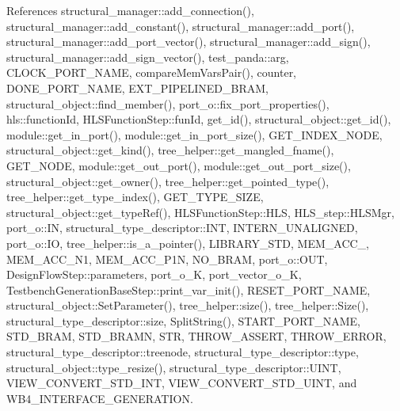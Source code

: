 References structural\+\_\+manager\+::add\+\_\+connection(), structural\+\_\+manager\+::add\+\_\+constant(), structural\+\_\+manager\+::add\+\_\+port(), structural\+\_\+manager\+::add\+\_\+port\+\_\+vector(), structural\+\_\+manager\+::add\+\_\+sign(), structural\+\_\+manager\+::add\+\_\+sign\+\_\+vector(), test\+\_\+panda\+::arg, C\+L\+O\+C\+K\+\_\+\+P\+O\+R\+T\+\_\+\+N\+A\+ME, compare\+Mem\+Vars\+Pair(), counter, D\+O\+N\+E\+\_\+\+P\+O\+R\+T\+\_\+\+N\+A\+ME, E\+X\+T\+\_\+\+P\+I\+P\+E\+L\+I\+N\+E\+D\+\_\+\+B\+R\+AM, structural\+\_\+object\+::find\+\_\+member(), port\+\_\+o\+::fix\+\_\+port\+\_\+properties(), hls\+::function\+Id, H\+L\+S\+Function\+Step\+::fun\+Id, get\+\_\+id(), structural\+\_\+object\+::get\+\_\+id(), module\+::get\+\_\+in\+\_\+port(), module\+::get\+\_\+in\+\_\+port\+\_\+size(), G\+E\+T\+\_\+\+I\+N\+D\+E\+X\+\_\+\+N\+O\+DE, structural\+\_\+object\+::get\+\_\+kind(), tree\+\_\+helper\+::get\+\_\+mangled\+\_\+fname(), G\+E\+T\+\_\+\+N\+O\+DE, module\+::get\+\_\+out\+\_\+port(), module\+::get\+\_\+out\+\_\+port\+\_\+size(), structural\+\_\+object\+::get\+\_\+owner(), tree\+\_\+helper\+::get\+\_\+pointed\+\_\+type(), tree\+\_\+helper\+::get\+\_\+type\+\_\+index(), G\+E\+T\+\_\+\+T\+Y\+P\+E\+\_\+\+S\+I\+ZE, structural\+\_\+object\+::get\+\_\+type\+Ref(), H\+L\+S\+Function\+Step\+::\+H\+LS, H\+L\+S\+\_\+step\+::\+H\+L\+S\+Mgr, port\+\_\+o\+::\+IN, structural\+\_\+type\+\_\+descriptor\+::\+I\+NT, I\+N\+T\+E\+R\+N\+\_\+\+U\+N\+A\+L\+I\+G\+N\+ED, port\+\_\+o\+::\+IO, tree\+\_\+helper\+::is\+\_\+a\+\_\+pointer(), L\+I\+B\+R\+A\+R\+Y\+\_\+\+S\+TD, M\+E\+M\+\_\+\+A\+C\+C\+\_, M\+E\+M\+\_\+\+A\+C\+C\+\_\+\+N1, M\+E\+M\+\_\+\+A\+C\+C\+\_\+\+P1N, N\+O\+\_\+\+B\+R\+AM, port\+\_\+o\+::\+O\+UT, Design\+Flow\+Step\+::parameters, port\+\_\+o\+\_\+K, port\+\_\+vector\+\_\+o\+\_\+K, Testbench\+Generation\+Base\+Step\+::print\+\_\+var\+\_\+init(), R\+E\+S\+E\+T\+\_\+\+P\+O\+R\+T\+\_\+\+N\+A\+ME, structural\+\_\+object\+::\+Set\+Parameter(), tree\+\_\+helper\+::size(), tree\+\_\+helper\+::\+Size(), structural\+\_\+type\+\_\+descriptor\+::size, Split\+String(), S\+T\+A\+R\+T\+\_\+\+P\+O\+R\+T\+\_\+\+N\+A\+ME, S\+T\+D\+\_\+\+B\+R\+AM, S\+T\+D\+\_\+\+B\+R\+A\+MN, S\+TR, T\+H\+R\+O\+W\+\_\+\+A\+S\+S\+E\+RT, T\+H\+R\+O\+W\+\_\+\+E\+R\+R\+OR, structural\+\_\+type\+\_\+descriptor\+::treenode, structural\+\_\+type\+\_\+descriptor\+::type, structural\+\_\+object\+::type\+\_\+resize(), structural\+\_\+type\+\_\+descriptor\+::\+U\+I\+NT, V\+I\+E\+W\+\_\+\+C\+O\+N\+V\+E\+R\+T\+\_\+\+S\+T\+D\+\_\+\+I\+NT, V\+I\+E\+W\+\_\+\+C\+O\+N\+V\+E\+R\+T\+\_\+\+S\+T\+D\+\_\+\+U\+I\+NT, and W\+B4\+\_\+\+I\+N\+T\+E\+R\+F\+A\+C\+E\+\_\+\+G\+E\+N\+E\+R\+A\+T\+I\+ON.



